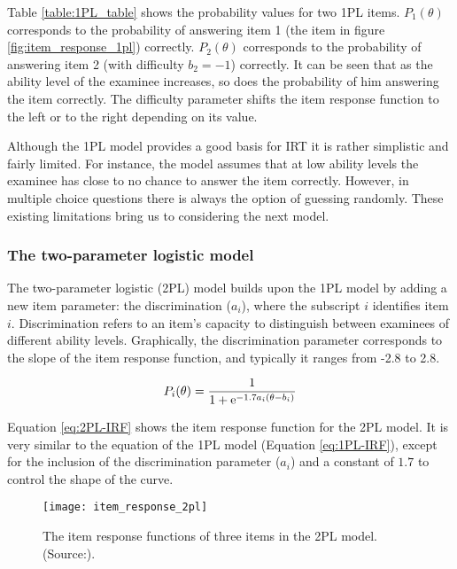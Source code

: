Table \ref{table:1PL_table} shows the probability values for two 1PL items. $P_1(\theta)$ corresponds to the probability of answering item 1 (the item in figure \ref{fig:item_response_1pl}) correctly. $P_2(\theta)$ corresponds to the probability of answering item 2 (with difficulty $b_2=-1$) correctly. It can be seen that as the ability level of the examinee increases, so does the probability of him answering the item correctly. The difficulty parameter shifts the item response function to the left or to the right depending on its value. \newline

Although the 1PL model provides a good basis for IRT it is rather simplistic and fairly limited. For instance, the model assumes that at low ability levels the examinee has close to no chance to answer the item correctly. However, in multiple choice questions there is always the option of guessing randomly. These existing limitations bring us to considering the next model.

\subsubsection{The two-parameter logistic model}
The two-parameter logistic (2PL) model builds upon the 1PL model by adding a new item parameter: the discrimination ($a_i$), where the subscript $i$ identifies item $i$. Discrimination refers to an item's capacity to distinguish between examinees of different ability levels. Graphically, the discrimination parameter corresponds to the slope of the item response function, and typically it ranges from -2.8 to 2.8.

\begin{equation} \label{eq:2PL-IRF}
P_i(\theta) = \frac{1}{1 + \mathrm{e}^{-1.7a_i(\theta - b_i)}}
\end{equation}

Equation \eqref{eq:2PL-IRF} shows the item response function for the 2PL model. It is very similar to the equation of the 1PL model (Equation \eqref{eq:1PL-IRF}), except for the inclusion of the discrimination parameter ($a_i$) and a constant of $1.7$ to control the shape of the curve.

\begin{figure}[H]
\centering
\texttt{[image: item\_response\_2pl]}
\caption{The item response functions of three items in the 2PL model. (Source:\cite{Visual-IRT}).}
\label{fig:item_response_2pl}
\end{figure}


